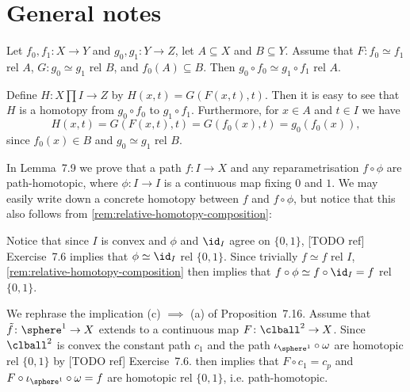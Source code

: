 \documentclass[article, a4paper, 11pt, oneside]{memoir}
\numberwithin{equation}{chapter}
\theoremstyle{nonumberplain}
\begin{document}
\section*{General notes}

\begin{remarkbreak}
    \label{rem:relative-homotopy-composition}
    Let $f_0,f_1 \colon X \to Y$ and $g_0,g_1 \colon Y \to Z$, let $A \subseteq X$ and $B \subseteq Y$. Assume that $F \colon f_0 \simeq f_1$ rel $A$, $G \colon g_0 \simeq g_1$ rel $B$, and $f_0(A) \subseteq B$. Then $g_0 \circ f_0 \simeq g_1 \circ f_1$ rel $A$.

    Define $H \colon X \prod I \to Z$ by $H(x,t) = G(F(x,t),t)$. Then it is easy to see that $H$ is a homotopy from $g_0 \circ f_0$ to $g_1 \circ f_1$. Furthermore, for $x \in A$ and $t \in I$ we have
    \begin{equation*}
        H(x,t)
            = G(F(x,t),t)
            = G(f_0(x),t)
            = g_0(f_0(x)),
    \end{equation*}
    since $f_0(x) \in B$ and $g_0 \simeq g_1$ rel $B$.
\end{remarkbreak}


\begin{remarkbreak}[Reparametrisation]
    In Lemma~7.9 we prove that a path $f \colon I \to X$ and any reparametrisation $f \circ \phi$ are path-homotopic, where $\phi \colon I \to I$ is a continuous map fixing $0$ and $1$. We may easily write down a concrete homotopy between $f$ and $f \circ \phi$, but notice that this also follows from \cref{rem:relative-homotopy-composition}:

    Notice that since $I$ is convex and $\phi$ and $\id_I$ agree on $\{0,1\}$, [TODO ref] Exercise~7.6 implies that $\phi \simeq \id_I$ rel $\{0,1\}$. Since trivially $f \simeq f$ rel $I$, \cref{rem:relative-homotopy-composition} then implies that $f \circ \phi \simeq f \circ \id_I = f$ rel $\{0,1\}$.
\end{remarkbreak}


\begin{remarkbreak}
    We rephrase the implication (c) $\implies$ (a) of Proposition~7.16. Assume that $\tilde{f} \colon \sphere^1 \to X$ extends to a continuous map $F \colon \clball^2 \to X$. Since $\clball^2$ is convex the constant path $c_1$ and the path $\iota_{\sphere^1} \circ \omega$ are homotopic rel $\{0,1\}$ by [TODO ref] Exercise~7.6.  then implies that $F \circ c_1 = c_p$ and $F \circ \iota_{\sphere^1} \circ \omega = f$ are homotopic rel $\{0,1\}$, i.e. path-homotopic.
\end{remarkbreak}
\end{document}

